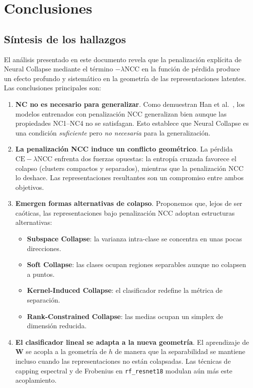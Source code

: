 \documentclass[12pt,a4paper]{report}
\newcommand{\NCC}{\text{NCC}}
\newcommand{\CE}{\text{CE}}
\begin{document}
\chapter{Conclusiones}
\label{chap:conclusiones}

\section{Síntesis de los hallazgos}

El análisis presentado en este documento revela que la penalización explícita de Neural Collapse mediante el término $-\lambda\NCC$ en la función de pérdida produce un efecto profundo y sistemático en la geometría de las representaciones latentes. Las conclusiones principales son:

\begin{enumerate}
    \item \textbf{NC no es necesario para generalizar}. Como demuestran Han et al.~\cite{han2025flatness}, los modelos entrenados con penalización NCC generalizan bien aunque las propiedades NC1--NC4 no se satisfagan. Esto establece que Neural Collapse es una condición \emph{suficiente} pero \emph{no necesaria} para la generalización.

    \item \textbf{La penalización NCC induce un conflicto geométrico}. La pérdida $\CE - \lambda\NCC$ enfrenta dos fuerzas opuestas: la entropía cruzada favorece el colapso (clusters compactos y separados), mientras que la penalización NCC lo deshace. Las representaciones resultantes son un compromiso entre ambos objetivos.

    \item \textbf{Emergen formas alternativas de colapso}. Proponemos que, lejos de ser caóticas, las representaciones bajo penalización NCC adoptan estructuras alternativas:
    \begin{itemize}
        \item \textbf{Subspace Collapse}: la varianza intra-clase se concentra en unas pocas direcciones.
        \item \textbf{Soft Collapse}: las clases ocupan regiones separables aunque no colapsen a puntos.
        \item \textbf{Kernel-Induced Collapse}: el clasificador redefine la métrica de separación.
        \item \textbf{Rank-Constrained Collapse}: las medias ocupan un simplex de dimensión reducida.
    \end{itemize}

    \item \textbf{El clasificador lineal se adapta a la nueva geometría}. El aprendizaje de $\mathbf{W}$ se acopla a la geometría de $h$ de manera que la separabilidad se mantiene incluso cuando las representaciones no están colapsadas. Las técnicas de capping espectral y de Frobenius en \texttt{rf\_resnet18} modulan aún más este acoplamiento.
\end{enumerate}
\end{document}
